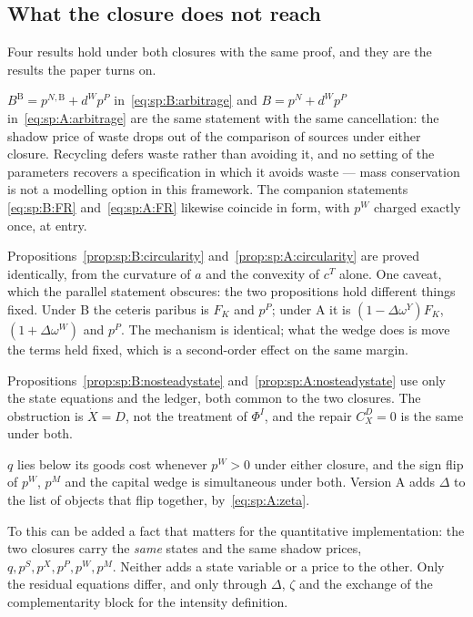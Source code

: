 \subsection{What the closure does not reach}\label{sec:sp:compare:common}

Four results hold under both closures with the same proof, and they are the results the paper turns
on.

 $B^{\mathrm B}=p^{N,\mathrm B}+d^Wp^P$
in~\eqref{eq:sp:B:arbitrage} and $B=p^N+d^Wp^P$ in~\eqref{eq:sp:A:arbitrage} are the same statement
with the same cancellation: the shadow price of waste drops out of the comparison of sources under
either closure. Recycling defers waste rather than avoiding it, and no setting of the parameters
recovers a specification in which it avoids waste --- mass conservation is not a modelling option in
this framework. The companion statements \eqref{eq:sp:B:FR} and~\eqref{eq:sp:A:FR} likewise coincide
in form, with $p^W$ charged exactly once, at entry.

 Propositions~\ref{prop:sp:B:circularity}
and~\ref{prop:sp:A:circularity} are proved identically, from the curvature of $a$ and the convexity of
$c^T$ alone. One caveat, which the parallel statement obscures: the two propositions hold different
things fixed. Under B the ceteris paribus is $F_K$ and $p^P$; under A it is
$\left(1-\Delta\omega^Y\right)F_K$, $\left(1+\Delta\omega^W\right)$ and $p^P$. The mechanism is
identical; what the wedge does is move the terms held fixed, which is a second-order effect on the
same margin.

 Propositions~\ref{prop:sp:B:nosteadystate}
and~\ref{prop:sp:A:nosteadystate} use only the state equations and the ledger, both common to the two
closures. The obstruction is $\dot X=D$, not the treatment of $\Phi^I$, and the repair $C^D_X=0$ is
the same under both.

 $q$ lies below its goods cost whenever $p^W>0$
under either closure, and the sign flip of $p^W$, $p^M$ and the capital wedge is simultaneous under
both. Version A adds $\Delta$ to the list of objects that flip together, by~\eqref{eq:sp:A:zeta}.

To this can be added a fact that matters for the quantitative implementation: the two closures carry
the \emph{same} states and the same shadow prices, $q,p^S,p^X,p^P,p^W,p^M$. Neither adds a state
variable or a price to the other. Only the residual equations differ, and only through $\Delta$,
$\zeta$ and the exchange of the complementarity block for the intensity definition.


